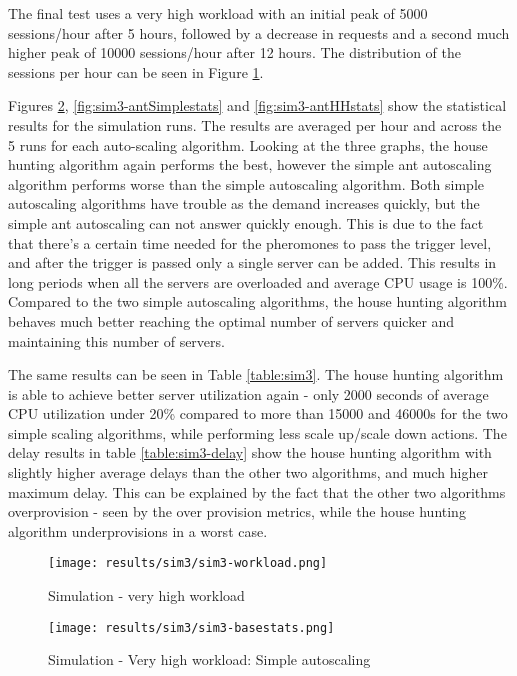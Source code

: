 The final test uses a very high workload with an initial peak of 5000 sessions/hour after 5 hours, followed by a decrease in requests and a second much higher peak of 10000 sessions/hour after 12 hours. The distribution of the sessions per hour can be seen in Figure \ref{fig:sim3-workload}.

Figures \ref{fig:sim3-basestats}, \ref{fig:sim3-antSimplestats} and \ref{fig:sim3-antHHstats} show the statistical results for the simulation runs. The results are averaged per hour and across the 5 runs for each auto-scaling algorithm. Looking at the three graphs, the house hunting algorithm again performs the best, however the simple ant autoscaling algorithm performs worse than the simple autoscaling algorithm. Both simple autoscaling algorithms have trouble as the demand increases quickly, but the simple ant autoscaling can not answer quickly enough. This is due to the fact that there's a certain time needed for the pheromones to pass the trigger level, and after the trigger is passed only a single server can be added. This results in long periods when all the servers are overloaded and average CPU usage is 100\%. Compared to the two simple autoscaling algorithms, the house hunting algorithm behaves much better reaching the optimal number of servers quicker and maintaining this number of servers.

The same results can be seen in Table \ref{table:sim3}. The house hunting algorithm is able to achieve better server utilization again - only 2000 seconds of average CPU utilization under 20\% compared to more than 15000 and 46000s for the two simple scaling algorithms, while performing less scale up/scale down actions.  The delay results in table \ref{table:sim3-delay} show the house hunting algorithm with slightly higher average delays than the other two algorithms, and much higher maximum delay. This can be explained by the fact that the other two algorithms overprovision - seen by the over provision metrics, while the house hunting algorithm underprovisions in a worst case.

\begin{figure}
	\centering
		\texttt{[image: results/sim3/sim3-workload.png]}
	\caption{Simulation - very high workload}
	\label{fig:sim3-workload}
\end{figure}

\begin{figure}
	\centering
		\texttt{[image: results/sim3/sim3-basestats.png]}
	\caption{Simulation - Very high workload: Simple autoscaling}
	\label{fig:sim3-basestats}
\end{figure}

